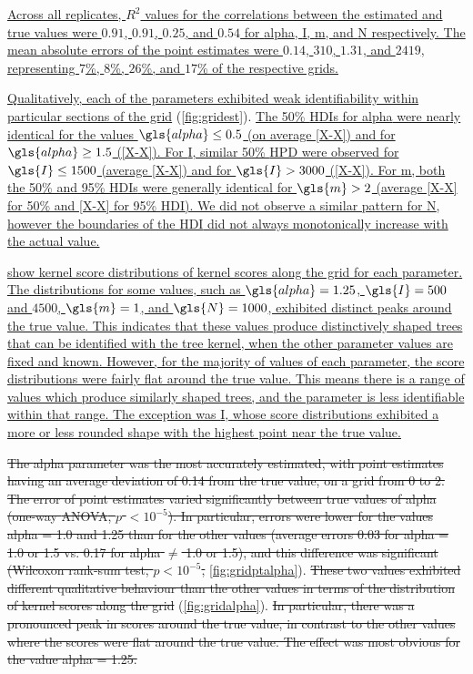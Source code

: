 {\color{blue}\uline{Across all replicates, $R^2$ values for the correlations
between the estimated and true values were
    $0.91$,
    $0.91$,
    $0.25$, and
    $0.54$
for \gls{alpha}, \gls{I}, \gls{m}, and \gls{N} respectively. The mean absolute
errors of the point estimates were
    $0.14$,
    $310$,
    $1.31$, and
    $2419$,
representing
    $7$\%,
    $8$\%,
    $26$\%, and
    $17$\%
of the respective grids.}

\uline{Qualitatively, each of the parameters exhibited weak identifiability
within particular sections of the grid} (\cref{fig:gridest}). \uline{The 50\%
\glspl{HDI} for \gls{alpha} were nearly identical for the values $\gls{alpha}
\leq 0.5$ (on average [X-X]) and for $\gls{alpha} \geq 1.5$ ([X-X]).
For \gls{I}, similar 50\% \gls{HPD} were observed for $\gls{I} \leq 1500$
(average [X-X]) and for $\gls{I} > 3000$ ([X-X]). For \gls{m}, both the 50\%
and 95\% \glspl{HDI} were generally identical for $\gls{m} > 2$ (average [X-X]
for 50\% and [X-X] for 95\% \gls{HDI}). We did not observe a similar pattern
for \gls{N}, however the boundaries of the \gls{HDI} did not always
monotonically increase with the actual value.}

 \uline{show kernel score
distributions of kernel scores along the grid for each parameter. The
distributions for some values, such as $\gls{alpha} = 1.25$, $\gls{I} = 500$
and $4500$, $\gls{m} = 1$, and $\gls{N} = 1000$, exhibited distinct peaks
around the true value. This indicates that these values produce distinctively
shaped trees that can be identified with the tree kernel, when the other
parameter values are fixed and known. However, for the majority of values of
each parameter, the score distributions were fairly flat around the true value. 
This means there is a range of values which produce similarly shaped trees, and
the parameter is less identifiable within that range. The exception was
\gls{I}, whose score distributions exhibited a more or less rounded shape with
the highest point near the true value. }}

{\color{red}\sout{The \gls{alpha} parameter was the most accurately estimated,
with point estimates having an average deviation of 
    0.14
from the true value, on a grid from 0 to 2. The error of point estimates varied
significantly between true values of \gls{alpha}
    (one-way \gls{ANOVA}, $p$ ${<}10^{-5}$). In
particular, errors were lower for the values \gls{alpha} = 1.0 and 1.25 than
for the other values
    (average errors 
    0.03
    for \gls{alpha} = 1.0 or 1.5 vs.
    0.17
    for \gls{alpha} $\neq$ 1.0 or 1.5),
and this difference was significant
    (Wilcoxon rank-sum test, $p {<}10^{-5}$,
}\cref{fig:gridptalpha}).
\sout{These two values exhibited different qualitative behaviour than the other
values in terms of the distribution of kernel scores along the grid
}(\cref{fig:gridalpha}). \sout{In particular, there was a pronounced peak in scores
around the true value, in contrast to the other values where the scores were
flat around the true value. The effect was most obvious for the value
\gls{alpha} = 1.25.}}

